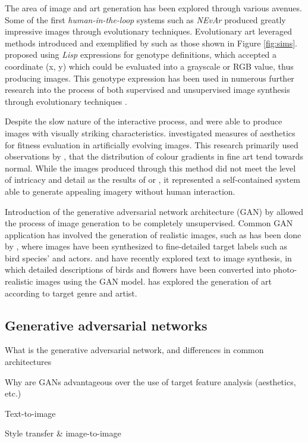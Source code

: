 \documentclass{article}
\begin{document}
The area of image and art generation has been explored through various avenues.
Some of the first \textit{human-in-the-loop} systems such as \textit{NEvAr} \citep{nevar} produced greatly impressive images  through evolutionary techniques.
Evolutionary art leveraged methods introduced and exemplified by \citet{sims} such as those shown in Figure \ref{fig:sims}.
\citet{sims} proposed using \textit{Lisp} expressions for genotype definitions, which accepted a coordinate (x, y) which could be evaluated into a grayscale or RGB value, thus producing images.
This genotype expression has been used in numerous further research into the process of both supervised and unsupervised image synthesis through evolutionary techniques \citep{nevar, sims, den2011evolving, distributed-evolutionary-art, aesthetic-measures}.

Despite the slow nature of the interactive process, \citet{sims} and \citet{nevar} were able to produce images with visually striking characteristics.
\citet{aesthetic-measures} investigated measures of aesthetics for fitness evaluation in artificially evolving images.
This research primarily used observations by \citet{ralph-bell-curve}, that the distribution of colour gradients in fine art tend towards normal.
While the images produced through this method did not meet the level of intricacy and detail as the results of \citet{sims} or \citet{nevar}, it represented a self-contained system able to generate appealing imagery without human interaction.

Introduction of the generative adversarial network architecture (GAN) by \citet{GAN} allowed the process of image generation to be completely unsupervised.
Common GAN application has involved the generation of realistic images, such as has been done by \citet{bao2017cvae}, where images have been synthesized to fine-detailed target labels such as bird species' and actors.
\citet{zhang2017stackgan} and \citet{reed2016generative} have recently explored text to image synthesis, in which detailed descriptions of birds and flowers have been converted into photo-realistic images using the GAN model.
\citet{tan2017artgan} has explored the generation of art according to target genre and artist.

\subsection{Generative adversarial networks}
\begin{todolist}
	\item What is the generative adversarial network, and differences in common architectures
	\item Why are GANs advantageous over the use of target feature analysis (aesthetics, etc.)
	\item Text-to-image
	\item Style transfer \& image-to-image
\end{todolist}
\end{document}
